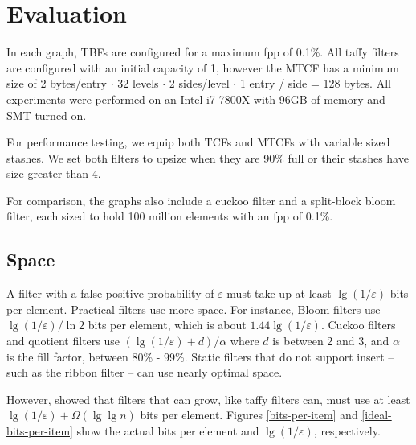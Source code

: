 \documentclass[manuscript,screen,review]{acmart}
\begin{document}

\section{Evaluation}
\label{eval}

In each graph, TBFs are configured for a maximum fpp of 0.1\%.
All taffy filters are configured with an initial capacity of 1, however the MTCF has a minimum size of 2 bytes/entry $\cdot$ 32 levels $\cdot$ 2 sides/level $\cdot$ 1 entry / side = 128 bytes.
All experiments were performed on an Intel i7-7800X with 96GB of memory and SMT turned on.

For performance testing, we equip both TCFs and MTCFs with variable sized stashes. \cite{stash}
We set both filters to upsize when they are 90\% full or their stashes have size greater than 4.

For comparison, the graphs also include a cuckoo filter and a split-block bloom filter, each sized to hold 100 million elements with an fpp of 0.1\%.

\subsection{Space}

A filter with a false positive probability of $\varepsilon$ must take up at least $\lg (1/\varepsilon)$ bits per element.
Practical filters use more space.
For instance, Bloom filters use $\lg (1/\varepsilon)/\ln 2$ bits per element, which is about $1.44 \lg (1/\varepsilon)$.
Cuckoo filters and quotient filters use $(\lg (1/\varepsilon) + d) / \alpha$ where $d$ is between 2 and 3, and $\alpha$ is the fill factor, between 80\% - 99\%. \cite{cuckoo,quotient-filter,vector-quotient}
Static filters that do not support insert -- such as the ribbon filter -- can use nearly optimal space. \cite{ribbon}

However, \cite{psw} showed that filters that can grow, like taffy filters can, must use at least $\lg (1/\varepsilon) + \Omega(\lg \lg n)$ bits per element.
Figures \ref{bits-per-item} and \ref{ideal-bits-per-item} show the actual bits per element and $\lg (1/\varepsilon)$, respectively.
\end{document}
